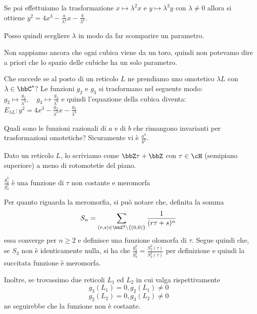 Se poi effettuiamo la trasformazione $x \mapsto \lambda^2 x$ e $y
\mapsto \lambda^3 y$ con $\lambda \neq 0$ allora si ottiene $y^2 = 4 x^3
- \frac{a}{\lambda^4} x - \frac{b}{\lambda^6}$.

Posso quindi scegliere $\lambda$ in modo da far scomparire un parametro.

\begin{osservazione}
  Non sappiamo ancora che ogni cubica viene da un toro, quindi non
  potevamo dire a priori che lo spazio delle cubiche ha un solo
  parametro.
\end{osservazione}

Che succede se al posto di un reticolo $L$ ne prendiamo uno omotetico
$\lambda L$ con $\lambda \in \bbC^*$? Le funzioni $g_2$ e $g_3$ si
trasformano nel seguente modo:
$ g_2 \mapsto \frac{g_2}{\lambda^4} ,\quad g_3 \mapsto
\frac{g_3}{\lambda^6}$ e quindi l'equazione della cubica diventa:
$E_{\lambda L}: y^2 = 4x^3 - \frac{g_2}{\lambda^4} x -
\frac{g_3}{\lambda^6}$

Quali sono le funzioni razionali di $a$ e di $b$ che rimangono
invarianti per trasformazioni omotetiche? Sicuramente vi è
$\frac{a^3}{b^2}$.

Dato un reticolo $L$, lo scriviamo come $\bbZ \tau + \bbZ$ con $\tau \in
\cH$ (semipiano superiore) a meno di rotomotetie del piano.

\begin{proposizione}
  $\frac{g_2^3}{g_3^2}$ è una funzione di $\tau$ non costante e meromorfa
\end{proposizione}

Per quanto riguarda la meromorfia, si può notare che, definita la somma
$$S_n = \sum_{(r, s) \in \bbZ^2 \setminus \{(0, 0)\}} \frac{1}{(r \tau
  + s)^n}$$ essa converge per $n \ge 2$ e definisce una funzione olomorfa
di $\tau$. Segue quindi che, se $S_3$ non è identicamente nulla, si ha
che $\frac{g_2^3}{g_3^2} = \frac{S_2^3(\tau)}{S_3^2(\tau)}$ per
definizione e quindi la succitata funzione è meromorfa.


Inoltre, se trovassimo due reticoli $L_1$ ed $L_2$ in cui valga
rispettivamente
$$g_3(L_1) = 0, g_2(L_1) \neq 0$$
$$g_2(L_2) = 0, g_3(L_2) \neq 0$$
ne seguirebbe che la funzione non è costante.

